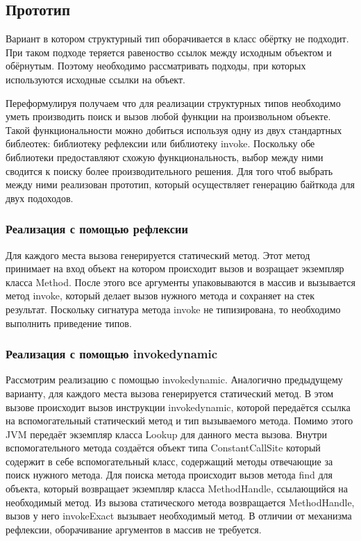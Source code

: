 
\subsection{Прототип}
Вариант в котором структурный тип оборачивается в класс обёртку не подходит. При таком подходе теряется равеноство ссылок между исходным объектом и обёрнутым. Поэтому необходимо рассматривать подходы, при которых используются исходные ссылки на объект.

Переформулируя получаем что для реализации структурных типов необходимо уметь производить поиск и вызов любой функции на произвольном объекте. Такой функциональности можно добиться используя одну из двух стандартных библеотек: библиотеку рефлексии или библиотеку invoke. Поскольку обе библиотеки предоставляют схожую функциональность, выбор между ними сводится к поиску более производительного решения. Для того чтоб выбрать между ними реализован прототип, который осуществляет генерацию байткода для двух подоходов.

\subsubsection{Реализация с помощью рефлексии}
Для каждого места вызова генерируется статический метод. Этот метод принимает на вход объект на котором происходит вызов и возращает экземпляр класса Method. После этого все аргументы упаковываются в массив и вызывается метод invoke, который делает вызов нужного метода и сохраняет на стек результат. Поскольку сигнатура метода invoke не типизирована, то необходимо выполнить приведение типов.

\subsubsection{Реализация с помощью invokedynamic}
Рассмотрим реализацию с помощью invokedynamic. Аналогично предыдущему варианту, для каждого места вызова генерируется статический метод. В этом вызове происходит вызов инструкции invokedynamic, которой передаётся ссылка на вспомогательный статический метод и тип вызываемого метода. Помимо этого JVM передаёт экземпляр класса Lookup для данного места вызова. Внутри вспомогательного метода создаётся объект типа ConstantCallSite который содержит в себе вспомогательный класс, содержащий методы отвечающие за поиск нужного метода. Для поиска метода происходит вызов метода find для объекта, который возвращает экземпляр класса MethodHandle, ссылающийся на необходимый метод. Из вызова статического метода возвращается MethodHandle, вызов у него invokeExact вызывает необходимый метод. В отличии от механизма рефлексии, оборачивание аргументов в массив не требуется.

